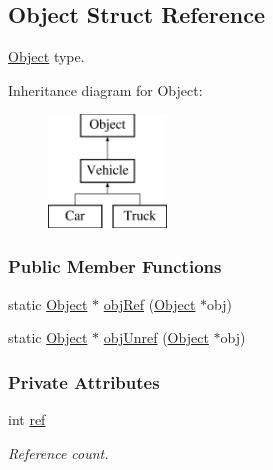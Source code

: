 \hypertarget{struct_object}{}\subsection{Object Struct Reference}
\label{struct_object}


\mbox{\hyperlink{struct_object}{Object}} type.  


Inheritance diagram for Object\+:\begin{figure}[H]
\begin{center}
\leavevmode
\includegraphics[height=3.000000cm]{struct_object}
\end{center}
\end{figure}
\subsubsection*{Public Member Functions}
\begin{DoxyCompactItemize}
\item 
static \mbox{\hyperlink{struct_object}{Object}} $\ast$ \mbox{\hyperlink{struct_object_a71225073d06a793b9a6ea9263ed37b12}{obj\+Ref}} (\mbox{\hyperlink{struct_object}{Object}} $\ast$obj)
\item 
static \mbox{\hyperlink{struct_object}{Object}} $\ast$ \mbox{\hyperlink{struct_object_a924ee0cecc906d148022b3f0d6325cfb}{obj\+Unref}} (\mbox{\hyperlink{struct_object}{Object}} $\ast$obj)
\end{DoxyCompactItemize}
\subsubsection*{Private Attributes}
\begin{DoxyCompactItemize}
\item 
\mbox{\label{struct_object_a1b6037fba835e83243ababce426ff9af}} 
int \mbox{\hyperlink{struct_object_a1b6037fba835e83243ababce426ff9af}{ref}}
\begin{DoxyCompactList}\small\item\em Reference count. \end{DoxyCompactList}\end{DoxyCompactItemize}


